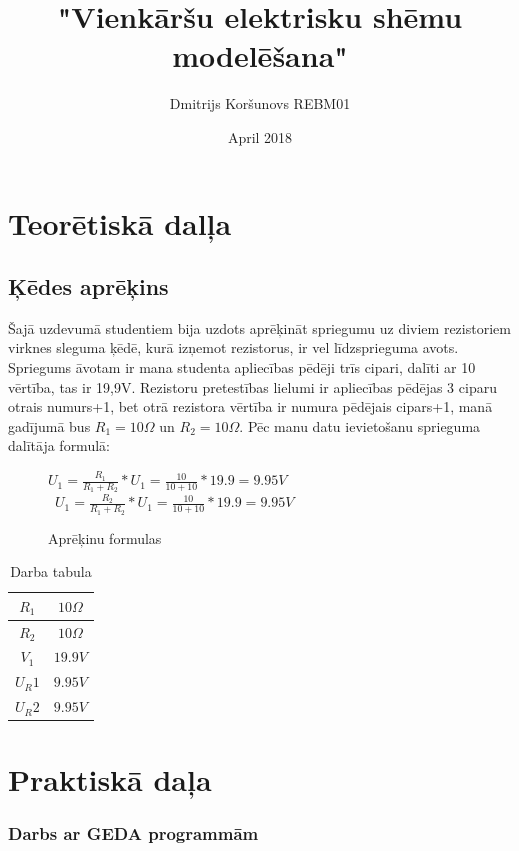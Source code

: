 \documentclass{report}
\title{"Vienkāršu elektrisku shēmu modelēšana"}
\author{Dmitrijs Koršunovs REBM01}
\date{April 2018}
\begin{document}
\maketitle
\chapter{Teorētiskā dalļa}
\section{Ķēdes aprēķins}
Šajā uzdevumā studentiem bija uzdots aprēķināt spriegumu uz diviem rezistoriem virknes sleguma ķēdē, kurā izņemot rezistorus, ir vel līdzsprieguma avots. Spriegums āvotam ir mana studenta apliecības pēdēji trīs cipari, dalīti ar 10 vērtība, tas ir 19,9V. Rezistoru pretestības lielumi ir apliecības pēdējas 3 ciparu otrais numurs+1, bet otrā rezistora vērtība ir numura pēdējais cipars+1, manā gadījumā bus $R_1=10\Omega$ un $R_2=10\Omega$.
Pēc manu datu ievietošanu sprieguma dalītāja formulā:\\
\begin{figure}[!h]
\centering
\noindent$U_1 = \frac{R_1}{R_1 + R_2}*U_1 =\frac{10}{10 + 10}*19.9 = 9.95 V $\\\ $U_1 = \frac{R_2}{R_1 + R_2}*U_1 =\frac{10}{10 + 10}*19.9 = 9.95 V $\\
\caption{Aprēķinu formulas}
\end{figure}
\label{Darba_tabula}
\par
\begin{table}[!h]
\centering
\begin{tabular}{|c|c|}
\hline
     $R_1$&$10\Omega$ \\
\hline
     $R_2$&$10\Omega$\\
\hline
     $V_1$&$19.9V$ \\
\hline
     $U_R1$&$9.95V$\\
\hline
     $U_R2$&$9.95V$\\   
\hline

\end{tabular}
\caption{Darba tabula}
\end{table}
\chapter{Praktiskā daļa}
\subsection{Darbs ar GEDA programmām}
\end{document}
